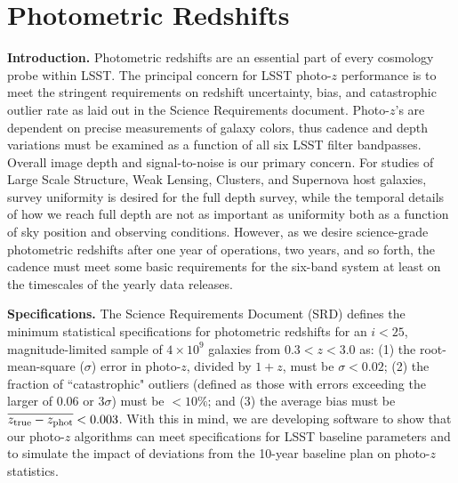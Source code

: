 %
%
%
%
%
%
\clearpage
\section{Photometric Redshifts}
\def\secname{photoz}\label{sec:\secname}


\textbf{Introduction.} Photometric redshifts are an essential part of every cosmology probe within LSST.  The principal concern for LSST photo-$z$ performance is to meet the stringent requirements on redshift uncertainty, bias, and catastrophic outlier rate as laid out in the Science Requirements document. Photo-$z$'s are dependent on precise measurements of galaxy colors, thus cadence and depth variations must be examined as a function of all six LSST filter bandpasses.  Overall image depth and signal-to-noise is our primary concern. For studies of Large Scale Structure, Weak Lensing, Clusters, and Supernova host galaxies, survey uniformity is desired for the full depth survey, while the temporal details of how we reach full depth are not as important as uniformity both as a function of sky position and observing conditions.  However, as we desire science-grade photometric redshifts after one year of operations, two years, and so forth, the cadence must meet some basic requirements for the six-band system at least on the timescales of the yearly data releases.

\textbf{Specifications.} The Science Requirements Document (SRD) defines the minimum statistical specifications for photometric redshifts for an $i<25$, magnitude-limited sample of $4\times10^9$ galaxies from $0.3<z<3.0$ as: (1) the root-mean-square ($\sigma$) error in photo-$z$, divided by $1+z$, must be $\sigma < 0.02$; (2) the fraction of ``catastrophic" outliers (defined as those with errors exceeding the larger of 0.06 or 3$\sigma$) must be $<10\%$; and (3) the average bias must be $\overline{z_{\rm true} - z_{\rm phot}} < 0.003$. With this in mind, we are developing software to show that our photo-$z$ algorithms can meet specifications for LSST baseline parameters and to simulate the impact of deviations from the 10-year baseline plan on photo-$z$ statistics.

